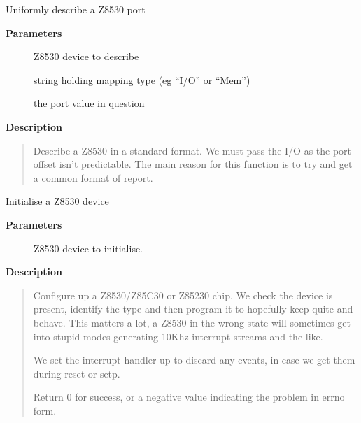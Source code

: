 \documentclass[a4paper,8pt,english]{sphinxmanual}
\begin{document}
\begin{fulllineitems}
\label{networking/z8530book:c.z8530_describe}
Uniformly describe a Z8530 port

\end{fulllineitems}


\textbf{Parameters}
\begin{description}
\item[{}] \leavevmode
Z8530 device to describe

\item[{}] \leavevmode
string holding mapping type (eg ``I/O'' or ``Mem'')

\item[{}] \leavevmode
the port value in question

\end{description}

\textbf{Description}
\begin{quote}

Describe a Z8530 in a standard format. We must pass the I/O as
the port offset isn't predictable. The main reason for this function
is to try and get a common format of report.
\end{quote}

\begin{fulllineitems}
\label{networking/z8530book:c.z8530_init}
Initialise a Z8530 device

\end{fulllineitems}


\textbf{Parameters}
\begin{description}
\item[{}] \leavevmode
Z8530 device to initialise.

\end{description}

\textbf{Description}
\begin{quote}

Configure up a Z8530/Z85C30 or Z85230 chip. We check the device
is present, identify the type and then program it to hopefully
keep quite and behave. This matters a lot, a Z8530 in the wrong
state will sometimes get into stupid modes generating 10Khz
interrupt streams and the like.

We set the interrupt handler up to discard any events, in case
we get them during reset or setp.

Return 0 for success, or a negative value indicating the problem
in errno form.
\end{quote}
\end{document}

